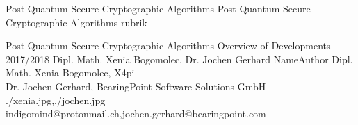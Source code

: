 \documentclass[a4paper,11pt]{article}
\begin{document}
\setcounter{footnote}{0}
\setcounter{figure}{0}


\Abschnitt
{Post-Quantum Secure Cryptographic Algorithms}
{Post-Quantum Secure Cryptographic Algorithms}
{rubrik}

\vspace{3mm}


\Aufsatz
{Post-Quantum Secure Cryptographic Algorithms}
{Overview of Developments 2017/2018}
{Dipl. Math. Xenia Bogomolec, Dr. Jochen Gerhard}
{NameAuthor}
{Dipl. Math. Xenia Bogomolec, X4pi \\ Dr. Jochen Gerhard, BearingPoint Software Solutions GmbH}
{./xenia.jpg,./jochen.jpg}
{indigomind@protonmail.ch,jochen.gerhard@bearingpoint.com}
\end{document}
